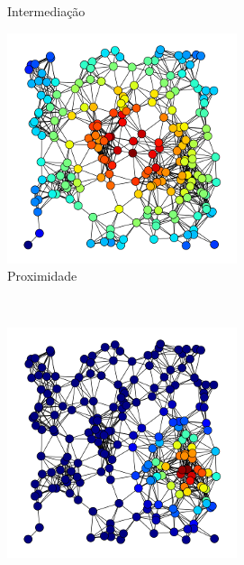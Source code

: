 \begin{figure}[ht]
\begin{subfigure}{0.27\textwidth}
        \caption{Intermediação} \label{fig:betweenness}
    \end{subfigure}
    \begin{subfigure}{0.27\textwidth}
        \includegraphics[width=\linewidth]{imagens/closeness.png}
        \caption{Proximidade} \label{fig:closeness}
    \end{subfigure}
    \\
    \vspace*{0.2cm}
    \begin{subfigure}{0.27\textwidth}
        \includegraphics[width=\linewidth]{imagens/eigenvector.png}

\end{subfigure}
\end{figure}
